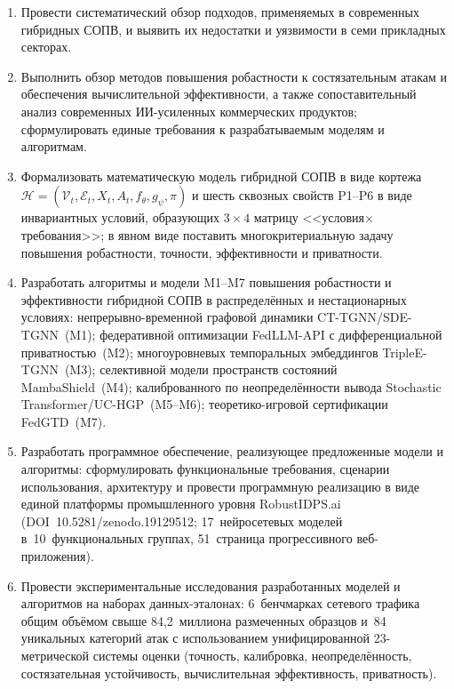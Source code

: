 \documentclass[12pt,a5paper]{article}
\begin{document}
\begin{enumerate}
\item Провести систематический обзор подходов, применяемых в
современных гибридных СОПВ, и выявить их недостатки и уязвимости
в семи прикладных секторах.

\item Выполнить обзор методов повышения робастности к
состязательным атакам и обеспечения вычислительной
эффективности, а также сопоставительный анализ современных
ИИ-усиленных коммерческих продуктов; сформулировать единые
требования к разрабатываемым моделям и алгоритмам.

\item Формализовать математическую модель гибридной СОПВ в виде
кортежа $\mathcal{H} = (\mathcal{V}_t, \mathcal{E}_t, X_t, A_t,
f_\theta, g_\psi, \pi)$ и шесть сквозных свойств P1--P6 в виде
инвариантных условий, образующих $3\times4$ матрицу
<<условия$\times$требования>>; в явном виде поставить
многокритериальную задачу повышения робастности, точности,
эффективности и приватности.

\item Разработать алгоритмы и модели M1--M7 повышения робастности
и эффективности гибридной СОПВ в распределённых и нестационарных
условиях: непрерывно-временной графовой динамики
CT-TGNN/SDE-TGNN~(M1); федеративной оптимизации FedLLM-API с
дифференциальной приватностью~(M2); многоуровневых темпоральных
эмбеддингов TripleE-TGNN~(M3); селективной модели пространств
состояний MambaShield~(M4); калиброванного по неопределённости
вывода Stochastic Transformer/UC-HGP~(M5--M6); теоретико-игровой
сертификации FedGTD~(M7).

\item Разработать программное обеспечение, реализующее
предложенные модели и алгоритмы: сформулировать функциональные
требования, сценарии использования, архитектуру и провести
программную реализацию в виде единой платформы промышленного
уровня RobustIDPS.ai (DOI~10.5281/zenodo.19129512;
17~нейросетевых моделей в~10~функциональных группах,
51~страница прогрессивного веб-приложения).

\item Провести экспериментальные исследования разработанных
моделей и алгоритмов на наборах данных-эталонах:
6~бенчмарках сетевого трафика общим объёмом свыше
84,2~миллиона размеченных образцов и~84 уникальных категорий
атак с использованием унифицированной 23-метрической системы
оценки (точность, калибровка, неопределённость, состязательная
устойчивость, вычислительная эффективность, приватность).


\end{enumerate}
\end{document}
